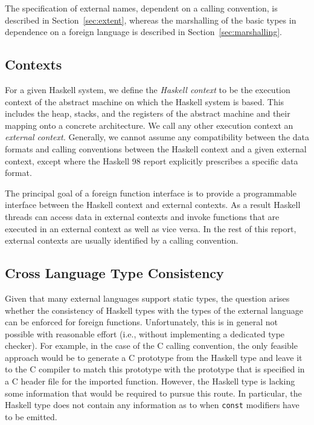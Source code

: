 \documentclass[a4paper,twoside]{article}
\newcommand{\code}[1]{\texttt{#1}}      %
\begin{document}
The specification of external names, dependent on a calling convention, is
described in Section~\ref{sec:extent}, whereas the marshalling of the basic
types in dependence on a foreign language is described in
Section~\ref{sec:marshalling}.

\subsection{Contexts}

For a given Haskell system, we define the \emph{Haskell context} to be the
execution context of the abstract machine on which the Haskell system is
based.  This includes the heap, stacks, and the registers of the abstract
machine and their mapping onto a concrete architecture.  We call any other
execution context an \emph{external context.}  Generally, we cannot assume any
compatibility between the data formats and calling conventions between the
Haskell context and a given external context, except where the Haskell 98
report explicitly prescribes a specific data format.

The principal goal of a foreign function interface is to provide a
programmable interface between the Haskell context and external contexts.  As
a result Haskell threads can access data in external contexts and invoke
functions that are executed in an external context as well as vice versa.  In
the rest of this report, external contexts are usually identified by a calling
convention. 

\subsection{Cross Language Type Consistency}

Given that many external languages support static types, the question arises
whether the consistency of Haskell types with the types of the external
language can be enforced for foreign functions.  Unfortunately, this is in
general not possible with reasonable effort (i.e., without implementing a
dedicated type checker).  For example, in the case of the C calling
convention, the only feasible approach would be to generate a C prototype from
the Haskell type and leave it to the C compiler to match this prototype with
the prototype that is specified in a C header file for the imported function.
However, the Haskell type is lacking some information that would be required
to pursue this route.  In particular, the Haskell type does not contain any
information as to when \code{const} modifiers have to be emitted.
\end{document}
